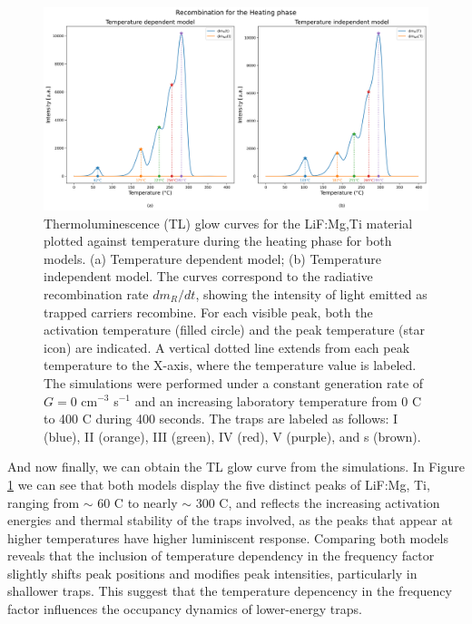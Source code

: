 \begin{figure}[H]
    \centering
    \includegraphics[width=\textwidth]{Images/GC_GlowCurve.png}
    \caption{Thermoluminescence (TL) glow curves for the LiF:Mg,Ti material plotted against temperature during the heating phase for both models. (a) Temperature dependent model; (b) Temperature independent model. The curves correspond to the radiative recombination rate $dm_R/dt$, showing the intensity of light emitted as trapped carriers recombine. For each visible peak, both the activation temperature (filled circle) and the peak temperature (star icon) are indicated. A vertical dotted line extends from each peak temperature to the X-axis, where the temperature value is labeled. The simulations were performed under a constant generation rate of $G = 0$ cm$^{-3}$ s$^{-1}$ and an increasing laboratory temperature from 0 \textdegree C to 400 \textdegree C during 400 seconds. The traps are labeled as follows: I (blue), II (orange), III (green), IV (red), V (purple), and s (brown).}
    \label{fig:heating_TLGlowCurve}
\end{figure}

And now finally, we can obtain the TL glow curve from the simulations. In Figure \ref{fig:heating_TLGlowCurve} we can see that both models display the five distinct peaks of LiF:Mg, Ti, ranging from $\sim$ 60 \textdegree C to nearly $\sim$ 300 \textdegree C, and reflects the increasing activation energies and thermal stability of the traps involved, as the peaks that appear at higher temperatures have higher luminiscent response. Comparing both models reveals that the inclusion of temperature dependency in the frequency factor slightly shifts peak positions and modifies peak intensities, particularly in shallower traps. This suggest that the temperature depencency in the frequency factor influences the occupancy dynamics of lower-energy traps. 

